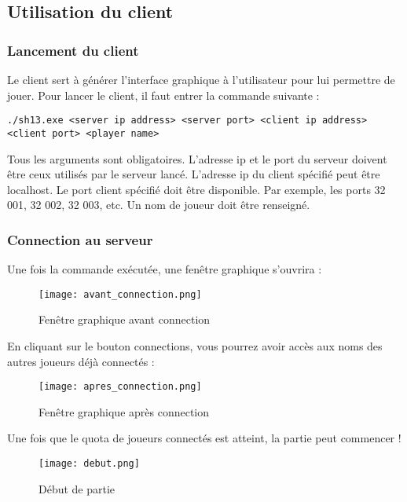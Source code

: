 \subsection{Utilisation du client}

\subsubsection{Lancement du client}

Le client sert à générer l'interface graphique à l'utilisateur pour lui permettre de jouer. Pour lancer le client, il faut entrer la commande suivante :
\begin{verbatim}
./sh13.exe <server ip address> <server port> <client ip address> <client port> <player name>
\end{verbatim}
Tous les arguments sont obligatoires. L'adresse ip et le port du serveur doivent être ceux utilisés par le serveur lancé. L'adresse ip du client spécifié peut être localhost. Le port client spécifié doit être disponible. Par exemple, les ports 32 001, 32 002, 32 003, etc. Un nom de joueur doit être renseigné.

\subsubsection{Connection au serveur}

Une fois la commande exécutée, une fenêtre graphique s'ouvrira :
\begin{figure}[H]
    \begin{center}
        \texttt{[image: avant\_connection.png]}
    \end{center}
     \caption{Fenêtre graphique avant connection}
    \label{fig:avant_connection}
\end{figure}
En cliquant sur le bouton connections, vous pourrez avoir accès aux noms des autres joueurs déjà connectés :
\begin{figure}[H]
    \begin{center}
        \texttt{[image: apres\_connection.png]}
    \end{center}
   	 \caption{Fenêtre graphique après connection}
    \label{fig:après_connection}
\end{figure}
Une fois que le quota de joueurs connectés est atteint, la partie peut commencer !
\begin{figure}[H]
    \begin{center}
        \texttt{[image: debut.png]}
    \end{center}
     \caption{Début de partie}
    \label{fig:debut}
\end{figure}

